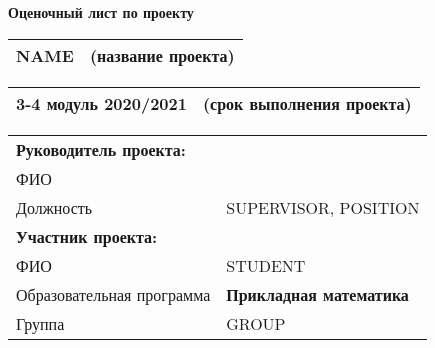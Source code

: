 \documentclass[10pt]{article}
\begin{document}
\sloppy	

\thispagestyle{empty}

\begin{center}
	{\Large \bf Оценочный лист по проекту}
\end{center}



\begin{table*}[h!]
	\centering
	\begin{tabular}{p{}<{\centering}b{}<{\raggedleft}}
		\noalign{\smallskip}
	 	NAME & (название проекта)\\
	\hline
	\end{tabular}
\end{table*}
\vspace{-0.5cm}
\begin{table*}[h!]
	\centering
	\begin{tabular}{p{}<{\centering}b{}<{\raggedleft}}
		\noalign{\smallskip}
		3-4 модуль 2020/2021& (срок выполнения проекта)\\
		\hline
	\end{tabular}
\end{table*}
\vspace{-0.5cm}

\begin{table*}[h!]
	\centering
	\begin{tabular}{|p{}<{\raggedright}|b{}|}
		\noalign{\smallskip}
		\hline
		{\bf Руководитель проекта:} & \\ 
		ФИО & \\
		Должность  & SUPERVISOR, POSITION \multirow{3}{*}{}\\
		\hline
		
		{\bf Участник проекта\footnotemark : } & \\ 
		
		\hline
		ФИО & STUDENT \\
		\hline
		Образовательная программа  & {\bf Прикладная математика}\\
		\hline
		Группа & GROUP\\
		\hline	
	\end{tabular}
\end{table*}
\end{document}
